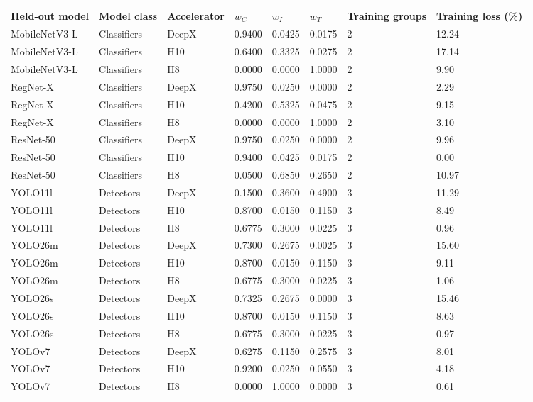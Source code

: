 \begin{tabular}{@{}llllllll@{}}
\toprule
Held-out model & Model class & Accelerator & $w_C$ & $w_I$ & $w_T$ & Training groups & Training loss (\%) \\
\midrule
MobileNetV3-L & Classifiers & DeepX & 0.9400 & 0.0425 & 0.0175 & 2 & 12.24 \\
MobileNetV3-L & Classifiers & H10 & 0.6400 & 0.3325 & 0.0275 & 2 & 17.14 \\
MobileNetV3-L & Classifiers & H8 & 0.0000 & 0.0000 & 1.0000 & 2 & 9.90 \\
RegNet-X & Classifiers & DeepX & 0.9750 & 0.0250 & 0.0000 & 2 & 2.29 \\
RegNet-X & Classifiers & H10 & 0.4200 & 0.5325 & 0.0475 & 2 & 9.15 \\
RegNet-X & Classifiers & H8 & 0.0000 & 0.0000 & 1.0000 & 2 & 3.10 \\
ResNet-50 & Classifiers & DeepX & 0.9750 & 0.0250 & 0.0000 & 2 & 9.96 \\
ResNet-50 & Classifiers & H10 & 0.9400 & 0.0425 & 0.0175 & 2 & 0.00 \\
ResNet-50 & Classifiers & H8 & 0.0500 & 0.6850 & 0.2650 & 2 & 10.97 \\
YOLO11l & Detectors & DeepX & 0.1500 & 0.3600 & 0.4900 & 3 & 11.29 \\
YOLO11l & Detectors & H10 & 0.8700 & 0.0150 & 0.1150 & 3 & 8.49 \\
YOLO11l & Detectors & H8 & 0.6775 & 0.3000 & 0.0225 & 3 & 0.96 \\
YOLO26m & Detectors & DeepX & 0.7300 & 0.2675 & 0.0025 & 3 & 15.60 \\
YOLO26m & Detectors & H10 & 0.8700 & 0.0150 & 0.1150 & 3 & 9.11 \\
YOLO26m & Detectors & H8 & 0.6775 & 0.3000 & 0.0225 & 3 & 1.06 \\
YOLO26s & Detectors & DeepX & 0.7325 & 0.2675 & 0.0000 & 3 & 15.46 \\
YOLO26s & Detectors & H10 & 0.8700 & 0.0150 & 0.1150 & 3 & 8.63 \\
YOLO26s & Detectors & H8 & 0.6775 & 0.3000 & 0.0225 & 3 & 0.97 \\
YOLOv7 & Detectors & DeepX & 0.6275 & 0.1150 & 0.2575 & 3 & 8.01 \\
YOLOv7 & Detectors & H10 & 0.9200 & 0.0250 & 0.0550 & 3 & 4.18 \\
YOLOv7 & Detectors & H8 & 0.0000 & 1.0000 & 0.0000 & 3 & 0.61 \\
\bottomrule
\end{tabular}

